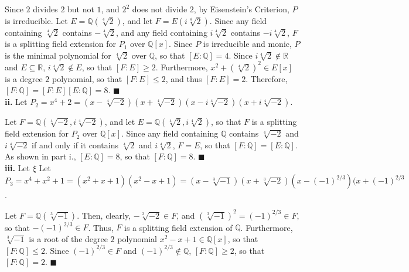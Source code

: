 \documentclass{article}
\begin{document}
Since $2$ divides $2$ but not $1$, and $2^2$ does not divide $2$, by
Eisenstein's Criterion, $P$ is irreducible. Let $E = \mathbb{Q}(\sqrt[4]{2})$,
and let $F = E(i\sqrt[4]{2})$. Since any field containing
$\sqrt[4]{2}$ contains $-\sqrt[4]{2}$, and any field containing
$i\sqrt[4]{2}$ contains $-i\sqrt[4]{2}$, $F$ is a splitting field extension
for $P_1$ over $\mathbb{Q}[x]$. Since $P$ is irreducible and monic, $P$ is the
minimal polynomial for $\sqrt[4]{2}$ over $\mathbb{Q}$, so that
$[E : \mathbb{Q}] = 4$. Since $i\sqrt[4]{2} \not \in \mathbb{R}$ and
$E \subseteq \mathbb{R}$, $i\sqrt[4]{2} \not \in E$, so that $[F : E] \geq 2$.
Furthermore, $x^2 + (\sqrt[4]{2})^2 \in E[x]$ is a degree $2$ polynomial, so
that $[F : E] \leq 2$, and thus $[F : E] = 2$. Therefore,
$[F : \mathbb{Q}] = [F : E][E : \mathbb{Q}] = 8$. \qquad $\blacksquare$ \\

\textbf{ii.} Let $P_2 = x^4 + 2 = 
                                                (x - \sqrt[4]{-2})
                                                (x + \sqrt[4]{-2})
                                                (x - i\sqrt[4]{-2})
                                                (x + i\sqrt[4]{-2})$.

Let $F = \mathbb{Q}(\sqrt[4]{-2},i\sqrt[4]{-2})$, and let
$E = \mathbb{Q}(\sqrt[4]{2},i\sqrt[4]{2})$, so that $F$ is a splitting field
extension for $P_2$ over $\mathbb{Q}[x]$. Since any field containing $\mathbb{Q}$
contains $\sqrt[4]{-2}$ and $i\sqrt[4]{-2}$ if and only if it contains $\sqrt[4]{2}$
and $i\sqrt[4]{2}$, $F = E$, so that $[F : \mathbb{Q}] = [E : \mathbb{Q}]$. As
shown in part i., $[E : \mathbb{Q}] = 8$, so that $[F :\mathbb{Q}] = 8$.
\qquad $\blacksquare$ \\

\textbf{iii.} Let $\xi$ Let $P_3 = x^4 + x^2 + 1 = (x^2 + x + 1)(x^2 - x + 1) =
                                                (x - \sqrt[3]{-1})
                                                (x + \sqrt[3]{-2})
                                                (x - (-1)^{2/3})
                                                (x + (-1)^{2/3}$.

Let $F = \mathbb{Q}(\sqrt[3]{-1})$. Then, clearly, $-\sqrt[3]{-2} \in F$, and
$(\sqrt[3]{-1})^2 = (-1)^{2/3} \in F$, so that $-(-1)^{2/3} \in F$. Thus, $F$
is a splitting field extension of $\mathbb{Q}$. Furthermore, $\sqrt[3]{-1}$ is
a root of the degree $2$ polynomial $x^2 - x + 1 \in \mathbb{Q}[x]$, so that
$[F : \mathbb{Q}] \leq 2$. Since $(-1)^{2/3} \in F$ and
$(-1)^{2/3} \not \in \mathbb{Q}$, $[F : \mathbb{Q}] \geq 2$, so that
$[F : \mathbb{Q}] = 2$. \qquad $\blacksquare$ \\
\end{document}
